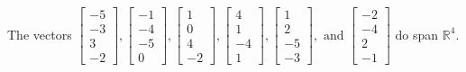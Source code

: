 \begin{exercise}
\begin{exerciseStatement}
  \end{exerciseStatement}
  \begin{exerciseAnswer}
   The vectors \(\left[\begin{array}{r}
-5 \\
-3 \\
3 \\
-2
\end{array}\right] , \left[\begin{array}{r}
-1 \\
-4 \\
-5 \\
0
\end{array}\right] , \left[\begin{array}{r}
1 \\
0 \\
4 \\
-2
\end{array}\right] , \left[\begin{array}{r}
4 \\
1 \\
-4 \\
1
\end{array}\right] , \left[\begin{array}{r}
1 \\
2 \\
-5 \\
-3
\end{array}\right] , \text{ and } \left[\begin{array}{r}
-2 \\
-4 \\
2 \\
-1
\end{array}\right]\) 
  	 do  
	span \(\mathbb{R}^4\).
  


  \end{exerciseAnswer}
\end{exercise}